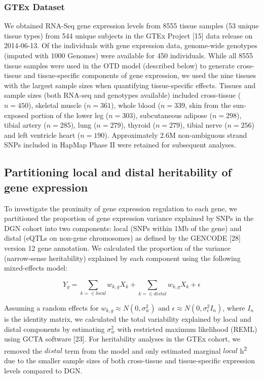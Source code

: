 \documentclass[]{article}
\begin{document}
\subsubsection{GTEx Dataset}\label{gtex-dataset}

We obtained RNA-Seq gene expression levels from 8555 tissue samples (53
unique tissue types) from 544 unique subjects in the GTEx Project
{[}15{]} data release on 2014-06-13. Of the individuals with gene
expression data, genome-wide genotypes (imputed with 1000 Genomes) were
available for 450 individuals. While all 8555 tissue samples were used
in the OTD model (described below) to generate cross-tissue and
tissue-specific components of gene expression, we used the nine tissues
with the largest sample sizes when quantifying tissue-specific effects.
Tissues and sample sizes (both RNA-seq and genotypes available) included
cross-tissue (\(n=450\)), skeletal muscle (\(n=361\)), whole blood
(\(n=339\), skin from the sun-exposed portion of the lower leg
(\(n=303\)), subcutaneous adipose (\(n=298\)), tibial artery
(\(n=285\)), lung (\(n=279\)), thyroid (\(n=279\)), tibial nerve
(\(n=256\)) and left ventricle heart (\(n=190\)). Approximately 2.6M
non-ambiguous strand SNPs included in HapMap Phase II were retained for
subsequent analyses.

\subsection{Partitioning local and distal heritability of gene
expression}\label{partitioning-local-and-distal-heritability-of-gene-expression}

To investigate the proximity of gene expression regulation to each gene,
we partitioned the proportion of gene expression variance explained by
SNPs in the DGN cohort into two components: local (SNPs within 1Mb of
the gene) and distal (eQTLs on non-gene chromosomes) as defined by the
GENCODE {[}28{]} version 12 gene annotation. We calculated the
proportion of the variance (narrow-sense heritability) explained by each
component using the following mixed-effects model:

\[ Y_g = \sum_{k = \in local}w_{k,g} X_k + \sum_{k = \in distal}w_{k,g} X_k + \epsilon \]

Assuming a random effects for \(w_{k,g} \approx N(0, \sigma^2_w)\) and
\(\epsilon \approx N(0, \sigma^2_{\epsilon} I_n)\), where \(I_n\) is the
identity matrix, we calculated the total variability explained by local
and distal components by estimating \(\sigma^2_w\) with restricted
maximum likelihood (REML) using GCTA software {[}23{]}. For heritability
analyses in the GTEx cohort, we removed the \(distal\) term from the
model and only estimated marginal \(local\) h\textsuperscript{2} due to
the smaller sample sizes of both cross-tissue and tissue-specific
expression levels compared to DGN.
\end{document}

